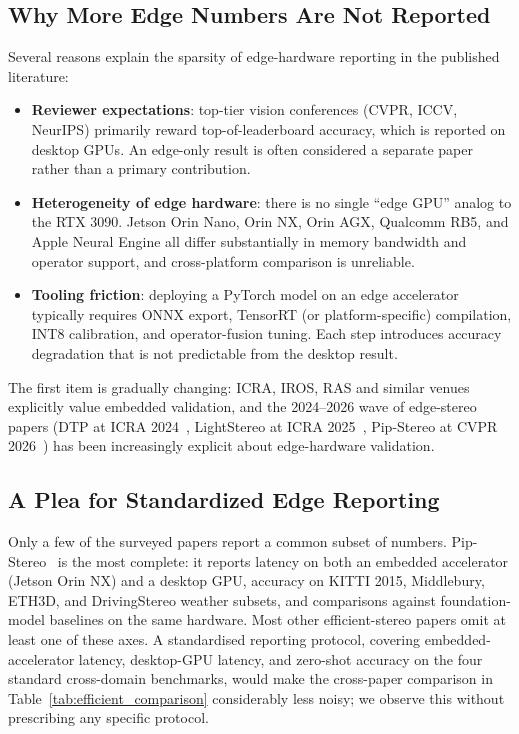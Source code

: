 \subsection{Why More Edge Numbers Are Not Reported}

Several reasons explain the sparsity of edge-hardware reporting in the published literature:

\begin{itemize}
\item \textbf{Reviewer expectations}: top-tier vision conferences (CVPR, ICCV, NeurIPS) primarily reward top-of-leaderboard accuracy, which is reported on desktop GPUs. An edge-only result is often considered a separate paper rather than a primary contribution.
\item \textbf{Heterogeneity of edge hardware}: there is no single ``edge GPU'' analog to the RTX 3090. Jetson Orin Nano, Orin NX, Orin AGX, Qualcomm RB5, and Apple Neural Engine all differ substantially in memory bandwidth and operator support, and cross-platform comparison is unreliable.
\item \textbf{Tooling friction}: deploying a PyTorch model on an edge accelerator typically requires ONNX export, TensorRT (or platform-specific) compilation, INT8 calibration, and operator-fusion tuning. Each step introduces accuracy degradation that is not predictable from the desktop result.
\end{itemize}

The first item is gradually changing: ICRA, IROS, RAS and similar venues explicitly value embedded validation, and the 2024--2026 wave of edge-stereo papers (DTP at ICRA 2024~\cite{pan2024dtp}, LightStereo at ICRA 2025~\cite{guo2025lightstereo}, Pip-Stereo at CVPR 2026~\cite{zheng2026pipstereo}) has been increasingly explicit about edge-hardware validation.

\subsection{A Plea for Standardized Edge Reporting}

Only a few of the surveyed papers report a common subset of numbers. Pip-Stereo~\cite{zheng2026pipstereo} is the most complete: it reports latency on both an embedded accelerator (Jetson Orin NX) and a desktop GPU, accuracy on KITTI 2015, Middlebury, ETH3D, and DrivingStereo weather subsets, and comparisons against foundation-model baselines on the same hardware. Most other efficient-stereo papers omit at least one of these axes. A standardised reporting protocol, covering embedded-accelerator latency, desktop-GPU latency, and zero-shot accuracy on the four standard cross-domain benchmarks, would make the cross-paper comparison in Table~\ref{tab:efficient_comparison} considerably less noisy; we observe this without prescribing any specific protocol.
